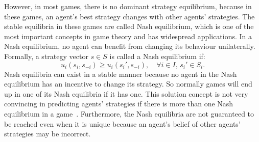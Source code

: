 \documentclass[11pt]{phdthesis}
\begin{document}
%
However, in most games, there is no dominant strategy equilibrium, because in these games, an agent's best strategy changes with other agents' strategies. The stable equilibria in these games are called Nash equilibrium, which is one of the most important concepts in game theory and has widespread applications. In a Nash equilibrium, no agent can benefit from changing its behaviour unilaterally. Formally, a strategy vector $ s\in S $ is called a Nash equilibrium if:
\[u_i(s_i,s_{-i}) \geq u_i(s_i',s_{-i}),\quad \forall  i \in I ,\,  s_i' \in S_i.\] 
Nash equilibria can exist in a stable manner because no agent in the Nash equilibrium has an incentive to change its strategy. So normally games will end up in one of its Nash equilibria if it has one. This solution concept is not very convincing in predicting agents' strategies if there is more than one Nash equilibrium in a game~\citep{nisan2007algorithmic}. Furthermore, the Nash equilibria are not guaranteed to be reached even when it is unique because an agent's belief of other agents' strategies may be incorrect. 


\end{document}
